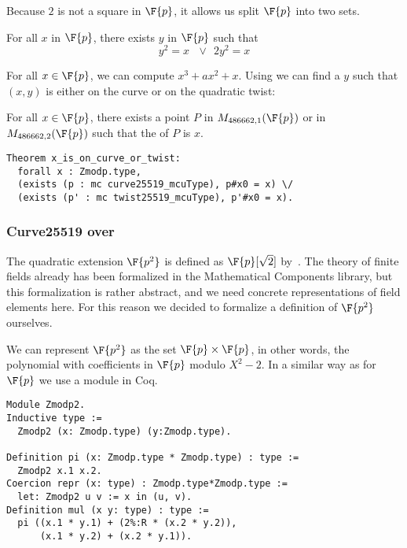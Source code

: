 Because $2$ is not a square in $\F{p}$, it allows us split $\F{p}$ into two sets.
\begin{lemma}
  \label{lemma:square-or-2square}
  For all $x$ in $\F{p}$, there exists $y$ in $\F{p}$ such that
  $$y^2 = x\ \ \ \lor\ \ 2y^2 = x$$
\end{lemma}
For all $x \in \F{p}$, we can compute $x^3 + ax^2 + x$. Using 
we can find a $y$ such that $(x,y)$ is either on the curve or on the quadratic twist:
\begin{lemma}
  \label{lemma:curve-or-twist}
  For all $x \in \F{p}$, there exists a point $P$ in $M_{486662,1}(\F{p})$ or
  in $M_{486662,2}(\F{p})$ such that the \xcoord of $P$ is $x$.
\end{lemma}
\begin{lstlisting}[language=Coq,belowskip=-0.5 \baselineskip]
Theorem x_is_on_curve_or_twist:
  forall x : Zmodp.type,
  (exists (p : mc curve25519_mcuType), p#x0 = x) \/
  (exists (p' : mc twist25519_mcuType), p'#x0 = x).
\end{lstlisting}

\subsubsection{Curve25519 over }
\label{subsec:curvep2}

The quadratic extension $\F{p^2}$ is defined as $\F{p}[\sqrt{2}]$ by~\cite{Ber06}.
The theory of finite fields already has been formalized in the Mathematical Components
library,
but this formalization is rather abstract, and we need concrete representations of field
elements here.
For this reason we decided to formalize a definition of $\F{p^2}$ ourselves.

We can represent $\F{p^2}$ as the set $\F{p} \times \F{p}$,
in other words,
the polynomial with coefficients in $\F{p}$ modulo $X^2 - 2$. In a similar way
as for $\F{p}$ we use a module in Coq.
\begin{lstlisting}[language=Coq,belowskip=-0.25 \baselineskip]
Module Zmodp2.
Inductive type :=
  Zmodp2 (x: Zmodp.type) (y:Zmodp.type).

Definition pi (x: Zmodp.type * Zmodp.type) : type :=
  Zmodp2 x.1 x.2.
Coercion repr (x: type) : Zmodp.type*Zmodp.type :=
  let: Zmodp2 u v := x in (u, v).
Definition mul (x y: type) : type :=
  pi ((x.1 * y.1) + (2%:R * (x.2 * y.2)),
      (x.1 * y.2) + (x.2 * y.1)).
\end{lstlisting}

